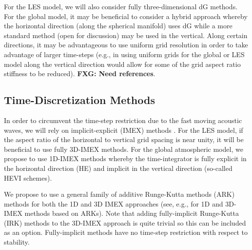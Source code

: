 For the LES model, we will also consider fully three-dimensional dG methods. For the global model, it may be beneficial to consider a hybrid approach whereby the horizontal direction (along the spherical manifold) uses dG while a more standard method (open for discussion) may be used in the vertical.  Along certain directions, it may be advantageous to use uniform grid resolution in order to take advantage of larger time-steps (e.g., in using uniform grids for the global or LES model along the vertical direction would allow for some of the grid aspect ratio stiffness to be reduced).  \textbf{FXG: Need references}.

\subsection{Time-Discretization Methods}

In order to circumvent the time-step restriction due to the fast moving acoustic waves, we will rely on implicit-explicit (IMEX) methods . For the LES model, if the aspect ratio of the horizontal to vertical grid spacing is near unity, it will be beneficial to use fully 3D-IMEX methods.  For the global atmospheric model, we propose to use 1D-IMEX methods whereby the time-integrator is fully explicit in the horizontal direction (HE) and implicit in the vertical direction (so-called HEVI schemes).

We propose to use a general family of additive Runge-Kutta methods (ARK) methods for both the 1D and 3D IMEX approaches (see, e.g., \cite{giraldo:2013} for 1D and 3D-IMEX methods based on ARKs). Note that adding fully-implicit Runge-Kutta (IRK) methods to the 3D-IMEX approach is quite trivial so this can be included as an option. Fully-implicit methods have no time-step restriction with respect to stability.

